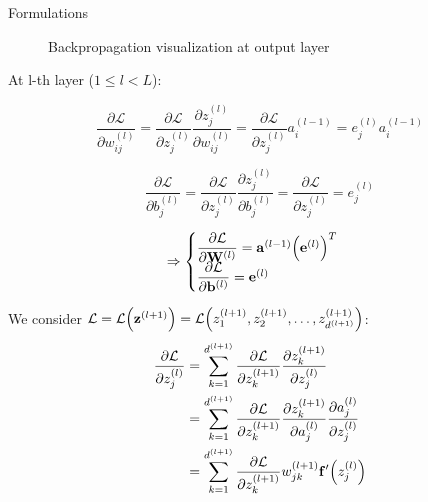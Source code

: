 \documentclass[10pt]{beamer}
\theoremstyle{remark}
\theoremstyle{definition}
\begin{document}
\begin{frame}[allowframebreaks]{Formulations}
\begin{figure}
{
		}
		\caption{Backpropagation visualization at output layer}
	\end{figure}

	At l-th layer ($1 \leq l < L$):

	\begin{equation}
		\dfrac{\partial \mathcal{L}}{\partial w_{ij}^{(l)}}=\dfrac{\partial \mathcal{L}}{\partial z_j^{(l)}}\dfrac{\partial z_j^{(l)}}{\partial w_{ij}^{(l)}}=\dfrac{\partial \mathcal{L}}{\partial z_j^{(l)}} a_i^{(l-1)}=e_j^{(l)}a_i^{(l-1)}
	\end{equation}

	\begin{equation}
		\dfrac{\partial \mathcal{L}}{\partial b_j^{(l)}}=\dfrac{\partial \mathcal{L}}{\partial z_j^{(l)}}\dfrac{\partial z_j^{(l)}}{\partial b_j^{(l)}}=\dfrac{\partial \mathcal{L}}{\partial z_j^{(l)}} = e_j^{(l)}
	\end{equation}

	\begin{equation}
		\Rightarrow \begin{cases} \dfrac{\partial \mathcal{L}}{\partial \bold{W}^{(l)}}=\bold{a}^{(l-1)}\Big(\bold{e}^{(l)}\Big)^T \\ \dfrac{\partial \mathcal{L}}{\partial \bold{b}^{(l)}}=\bold{e}^{(l)} \end{cases}
	\end{equation}

	We consider $\mathcal{L} = \mathcal{L}\Big(\bold{z}^{(l+1)}\Big)=\mathcal{L}\Big(z_1^{(l+1)}, z_2^{(l+1)}, \dots, z_{d^{(l+1)}}^{(l+1)}\Big)$:
	\begin{equation}
		\begin{aligned}
			\dfrac{\partial \mathcal{L}}{\partial z_j^{(l)}}&=\sum_{k=1}^{d^{(l+1)}}\dfrac{\partial \mathcal{L}}{\partial z_k^{(l+1)}} \dfrac{\partial z_k^{(l+1)}}{\partial z_j^{(l)}}\\&=\sum_{k=1}^{d^{(l+1)}} \dfrac{\partial \mathcal{L}}{\partial z_k^{(l+1)}} \dfrac{\partial z_k^{(l+1)}}{\partial a_j^{(l)}} \dfrac{\partial a_j^{(l)}}{\partial z_j^{(l)}}\\&=\sum_{k=1}^{d^{(l+1)}}\dfrac{\partial \mathcal{L}}{\partial z_k^{(l+1)}}w_{jk}^{(l+1)}\bold{f}^{\prime}\Big(z_j^{(l)}\Big)
		\end{aligned}
	\end{equation}


\end{frame}
\end{document}
